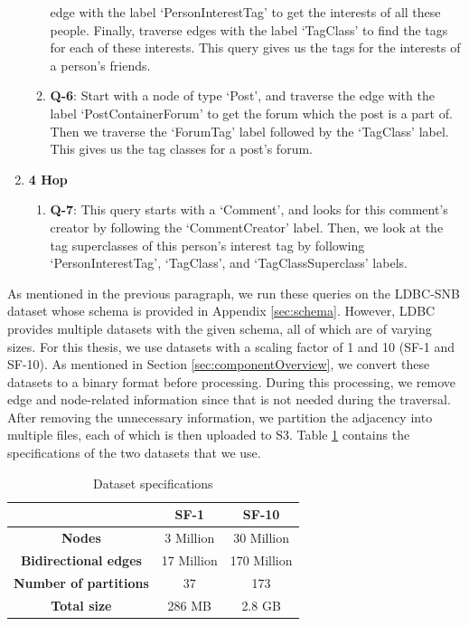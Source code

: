 \begin{enumerate}
\begin{enumerate}
                edge with the label `PersonInterestTag' to get the interests of all
                these people. Finally, traverse edges with the label `TagClass' to
                find the tags for each of these interests. This query gives us
                the tags for the interests of a person's friends.
            \item \textbf{Q-6}: Start with a node of type `Post', and traverse
                the edge with the label `PostContainerForum' to get the forum which
                the post is a part of. Then we traverse the `ForumTag' label
                followed by the `TagClass' label. This gives us the tag classes for
                a post's forum.
        \end{enumerate}
    \item \textbf{4 Hop}
        \begin{enumerate}
            \item \textbf{Q-7}: This query starts with a `Comment', and looks for
                this comment's creator by following the `CommentCreator' label.
                Then, we look at the tag superclasses of this person's interest
                tag by following `PersonInterestTag', `TagClass', and
                `TagClassSuperclass' labels.
        \end{enumerate}
\end{enumerate}

\medskip
As mentioned in the previous paragraph, we run these queries on the LDBC-SNB dataset
whose schema is provided in Appendix \ref{sec:schema}. However, LDBC provides
multiple datasets with the given schema, all of which are of varying sizes.
For this thesis, we use datasets with a scaling factor of 1 and 10 (SF-1 and
SF-10). As mentioned in Section \ref{sec:componentOverview}, we convert these
datasets to a binary format before processing. During this processing, we remove
edge and node-related information since that is not needed during the traversal.
After removing the unnecessary information, we partition the adjacency into
multiple files, each of which is then uploaded to S3.
Table \ref{table:dataSpecs} contains the specifications of the two datasets that
we use.


\begin{table}[h!]
 \centering
 \begin{tabular}{|c | c | c |} 
 \hline
  & SF-1 & SF-10 \\ [0.5ex] 
 \hline\hline
     \textbf{Nodes} & 3 Million & 30 Million \\ 
     \textbf{Bidirectional edges} & 17 Million & 170 Million \\
     \textbf{Number of partitions} & 37 & 173 \\
     \textbf{Total size} & 286 MB & 2.8 GB \\
 \hline
 \end{tabular}
 \caption{Dataset specifications}
 \label{table:dataSpecs}
\end{table}

